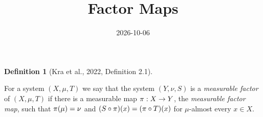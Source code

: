\documentclass[
  british,
]{article}
\title{Factor Maps}
\author{}
\date{2026-10-06}
\theoremstyle{plain}
\theoremstyle{definition}
\newtheorem{definition}{Definition}[section]
\theoremstyle{remark}
\newcommand{\Measure}{{\mu}}
\newcommand{\ProjectionMap}[1][\vphantom{}]{{\pi}_{#1}}
\begin{document}
\maketitle


\begin{definition}[{Kra et al., 2022, Definition
2.1}]\protect\hypertarget{def-MeasurableFactor}{}\label{def-MeasurableFactor}

For a system \((X,\Measure,T)\) we say that the system \((Y,\nu,S)\) is
a \emph{measurable factor} of \((X,\Measure,T)\) if there is a
measurable map \(\ProjectionMap:X\rightarrow Y\), the \emph{measurable
factor map}, such that \(\ProjectionMap(\Measure)=\nu\) and
\((S\circ\ProjectionMap)(x)=(\ProjectionMap\circ T)(x)\) for
\(\Measure\)-almost every \(x\in X\).

\end{definition}
\end{document}
